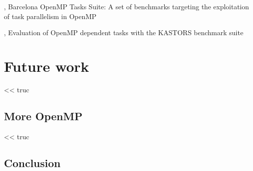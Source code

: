 \cite{Duran2009}, Barcelona OpenMP Tasks Suite: A set of benchmarks targeting the exploitation of task parallelism in OpenMP

\cite{Virouleau2014}, Evaluation of OpenMP dependent tasks with the KASTORS benchmark suite

\part{Future work}

\begin{savequote}[6cm]
<< truc
\end{savequote}

\chapter{More OpenMP}\label{chap:contrib:TODO}
\chaptertoc

%

\begin{savequote}[6cm]
<< truc
\end{savequote}

\chapter{Conclusion}\label{chap:contrib:TODO}
\chaptertoc

%
%
